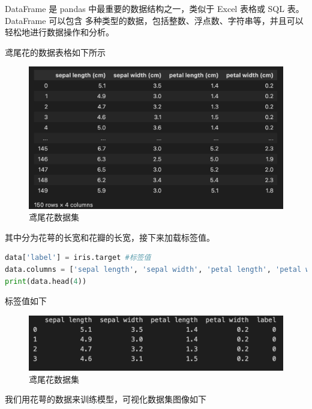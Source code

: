 DataFrame 是 pandas 中最重要的数据结构之一，类似于 Excel 表格或 SQL 表。DataFrame 可以包含
多种类型的数据，包括整数、浮点数、字符串等，并且可以轻松地进行数据操作和分析。

鸢尾花的数据表格如下所示

\begin{figure}[H]
    \centering
    \includegraphics[scale=0.4]{figures/鸢尾花数据集.png}
    \caption{鸢尾花数据集}
\end{figure}

其中分为花萼的长宽和花瓣的长宽，接下来加载标签值。

\begin{lstlisting}[language=Python]
data['label'] = iris.target #标签值
data.columns = ['sepal length', 'sepal width', 'petal length', 'petal width', 'label']
print(data.head(4))
\end{lstlisting}

标签值如下

\begin{figure}[H]
    \centering
    \includegraphics[scale=0.4]{figures/鸢尾花标签值.png}
    \caption{鸢尾花数据集}
\end{figure}

我们用花萼的数据来训练模型，可视化数据集图像如下

